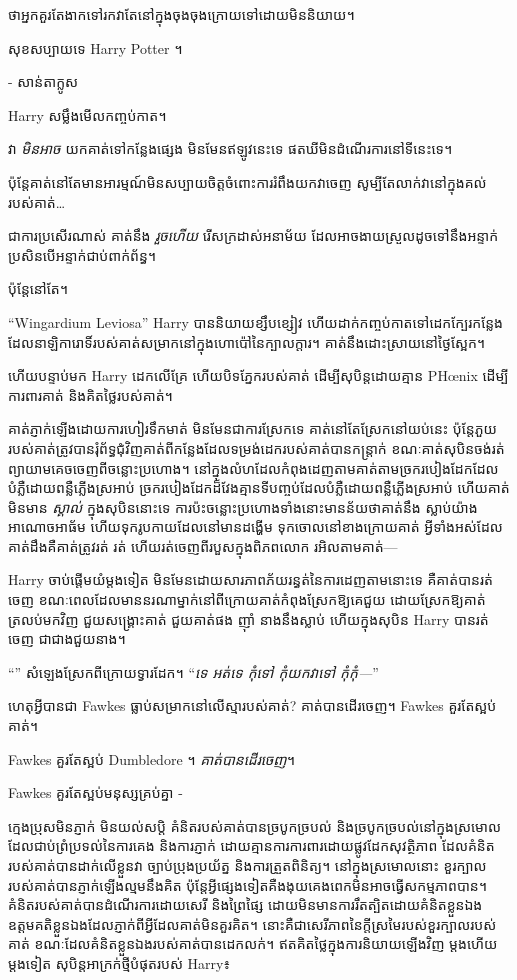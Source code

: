 {{{{{{{{{{{{{\begin{writtenNote}
ថាអ្នកគួរតែងាកទៅរកវាតែនៅក្នុងចុងចុងក្រោយទៅដោយមិននិយាយ។

សុខសប្បាយទេ Harry Potter ។

- សាន់តាក្លូស
\end{writtenNote}

Harry សម្លឹងមើលកញ្ចប់កាត។

វា \emph{មិនអាច} យកគាត់ទៅកន្លែងផ្សេង មិនមែនឥឡូវនេះទេ ផតឃីមិនដំណើរការនៅទីនេះទេ។

ប៉ុន្តែ​គាត់​នៅ​តែ​មាន​អារម្មណ៍​មិន​សប្បាយ​ចិត្ត​ចំពោះ​ការ​រំពឹង​យក​វា​ចេញ សូម្បី​តែ​លាក់​វា​នៅ​ក្នុង​គល់​របស់​គាត់…

ជាការប្រសើរណាស់ គាត់នឹង \emph{រួចហើយ} រើសក្រដាស់អនាម័យ ដែលអាចងាយស្រួលដូចទៅនឹងអន្ទាក់ ប្រសិនបើអន្ទាក់ជាប់ពាក់ព័ន្ធ។

ប៉ុន្តែនៅតែ។

“Wingardium Leviosa” Harry បាននិយាយខ្សឹបខ្សៀវ ហើយដាក់កញ្ចប់កាតទៅដេកក្បែរកន្លែងដែលនាឡិការោទិ៍របស់គាត់សម្រាកនៅក្នុងហោប៉ៅនៃក្បាលក្តារ។ គាត់នឹងដោះស្រាយនៅថ្ងៃស្អែក។

ហើយបន្ទាប់មក Harry ដេកលើគ្រែ ហើយបិទភ្នែករបស់គាត់ ដើម្បីសុបិន្តដោយគ្មាន PHœnix ដើម្បីការពារគាត់ និងគិតថ្លៃរបស់គាត់។

\later

គាត់ភ្ញាក់ឡើងដោយការហៀរទឹកមាត់ មិនមែនជាការស្រែកទេ គាត់នៅតែស្រែកនៅយប់នេះ ប៉ុន្តែភួយរបស់គាត់ត្រូវបានរុំព័ទ្ធជុំវិញគាត់ពីកន្លែងដែលទម្រង់ដេករបស់គាត់បានកន្ត្រាក់ ខណៈគាត់សុបិនចង់រត់ ព្យាយាមគេចចេញពីចន្លោះប្រហោង។ នៅក្នុងលំហដែលកំពុងដេញតាមគាត់តាមច្រករបៀងដែកដែលបំភ្លឺដោយពន្លឺភ្លើងស្រអាប់ ច្រករបៀងដែកដ៏វែងគ្មានទីបញ្ចប់ដែលបំភ្លឺដោយពន្លឺភ្លើងស្រអាប់ ហើយគាត់មិនមាន \emph{ស្គាល់} ក្នុងសុបិននោះទេ ការប៉ះចន្លោះប្រហោងទាំងនោះមានន័យថាគាត់នឹង ស្លាប់យ៉ាងអាណោចអាធ័ម ហើយទុករូបកាយដែលនៅមានដង្ហើម ទុកចោលនៅខាងក្រោយគាត់ អ្វីទាំងអស់ដែលគាត់ដឹងគឺគាត់ត្រូវរត់ រត់ ហើយរត់ចេញពីរបួសក្នុងពិភពលោក រអិលតាមគាត់—

Harry ចាប់ផ្តើមយំម្តងទៀត មិនមែនដោយសារភាពភ័យរន្ធត់នៃការដេញតាមនោះទេ គឺគាត់បានរត់ចេញ ខណៈពេលដែលមាននរណាម្នាក់នៅពីក្រោយគាត់កំពុងស្រែកឱ្យគេជួយ ដោយស្រែកឱ្យគាត់ត្រលប់មកវិញ ជួយសង្គ្រោះគាត់ ជួយគាត់ផង ញ៉ាំ នាង​នឹង​ស្លាប់ ហើយ​ក្នុង​សុបិន Harry បាន​រត់​ចេញ ជាជាង​ជួយ​នាង។

“” សំឡេងស្រែកពីក្រោយទ្វារដែក។ “\emph{ទេ អត់ទេ កុំទៅ កុំយកវាទៅ កុំកុំ—}”

ហេតុអ្វីបានជា Fawkes ធ្លាប់សម្រាកនៅលើស្មារបស់គាត់? គាត់​បាន​ដើរ​ចេញ។ Fawkes គួរតែស្អប់គាត់។

Fawkes គួរតែស្អប់ Dumbledore ។ \emph{គាត់បានដើរចេញ}។

Fawkes គួរតែស្អប់មនុស្សគ្រប់គ្នា -

ក្មេងប្រុសមិនភ្ញាក់ មិនយល់សប្តិ គំនិតរបស់គាត់បានច្របូកច្របល់ និងច្របូកច្របល់នៅក្នុងស្រមោលដែលជាប់ព្រំប្រទល់នៃការគេង និងការភ្ញាក់ ដោយគ្មានការការពារដោយផ្លូវដែកសុវត្ថិភាព ដែលគំនិតរបស់គាត់បានដាក់លើខ្លួនវា ច្បាប់ប្រុងប្រយ័ត្ន និងការត្រួតពិនិត្យ។ នៅក្នុង​ស្រមោល​នោះ ខួរក្បាល​របស់គាត់​បាន​ភ្ញាក់ឡើង​ល្មម​នឹង​គិត ប៉ុន្តែ​អ្វី​ផ្សេងទៀត​គឺ​ងងុយគេង​ពេក​មិនអាច​ធ្វើ​សកម្មភាព​បាន​។ គំនិតរបស់គាត់បានដំណើរការដោយសេរី និងព្រៃផ្សៃ ដោយមិនមានការរឹតត្បិតដោយគំនិតខ្លួនឯង ឧត្តមគតិខ្លួនឯងដែលភ្ញាក់ពីអ្វីដែលគាត់មិនគួរគិត។ នោះគឺជាសេរីភាពនៃក្តីស្រមៃរបស់ខួរក្បាលរបស់គាត់ ខណៈដែលគំនិតខ្លួនឯងរបស់គាត់បានដេកលក់។ ឥតគិតថ្លៃក្នុងការនិយាយឡើងវិញ ម្តងហើយម្តងទៀត សុបិន្តអាក្រក់ថ្មីបំផុតរបស់ Harry៖

}}}}}}}}}}}}}
